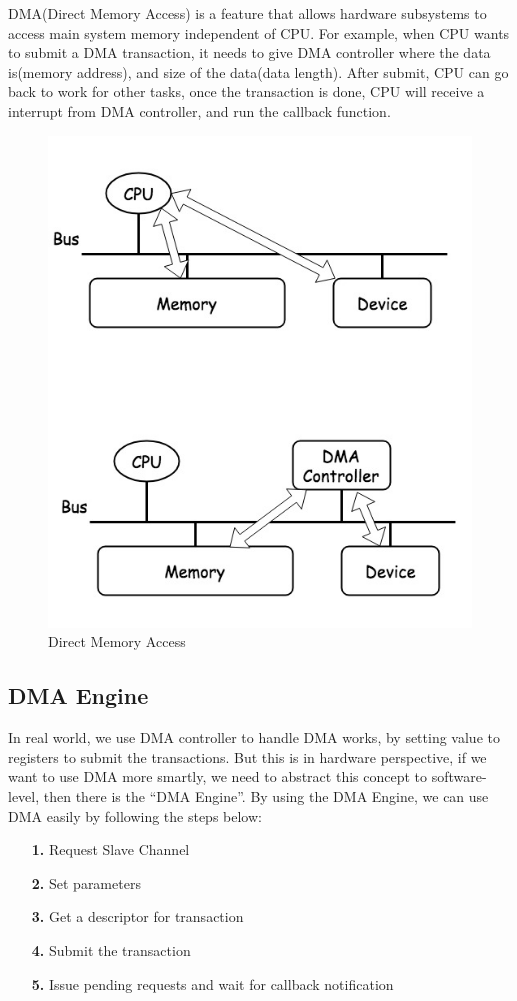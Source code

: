 DMA(Direct Memory Access) is a feature that allows hardware subsystems to access main system memory independent of CPU. For example, when CPU wants to submit a DMA transaction, it needs to give DMA controller where the data is(memory address), and size of the data(data length). After submit, CPU can go back to work for other tasks, once the transaction is done, CPU will receive a interrupt from DMA controller, and run the callback function.
\begin{figure}[!htb]
  \centering
  \includegraphics[scale=0.5]{images/DMA.jpg}
  \caption[Direct Memory Access]{Direct Memory Access}
  \label{fig:DMA}
\end{figure}
\newpage
\subsection{DMA Engine }
\label{subsec:DMA Engine}
In real world, we use DMA controller to handle DMA works, by setting value to registers to submit the transactions. But this is in hardware perspective, if we want to use DMA more smartly, we need to abstract this concept to software-level, then there is the ``DMA Engine''. By using the DMA Engine, we can use DMA easily by following the steps below:
\begin{itemize}
\setlength{\itemsep}{0pt}
\item[\textbf{1.}] Request Slave Channel
\item[\textbf{2.}] Set parameters 
\item[\textbf{3.}] Get a descriptor for transaction
\item[\textbf{4.}] Submit the transaction
\item[\textbf{5.}] Issue pending requests and wait for callback notification
\end{itemize}
